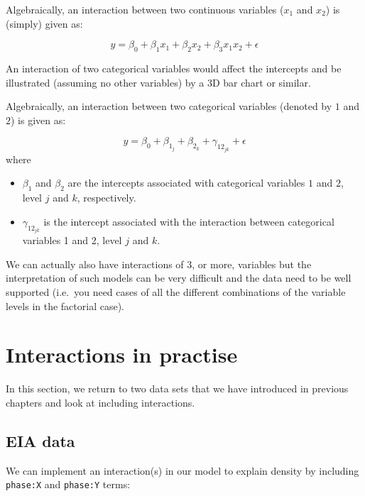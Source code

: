 \documentclass[
  oneside]{krantz}
\begin{document}
Algebraically, an interaction between two continuous variables (\(x_1\) and \(x_2\)) is (simply) given as:

\[y = \beta_0 + \beta_1 x_1 + \beta_2 x_2 + \beta_3 x_1x_2 + \epsilon\]

An interaction of two categorical variables would affect the intercepts and be illustrated (assuming no other variables) by a 3D bar chart or similar.

Algebraically, an interaction between two categorical variables (denoted by \(1\) and \(2\)) is given as:

\[y = \beta_0 + \beta_{1_j} + \beta_{2_k} + \gamma_{12_{jk}} + \epsilon\]
where

\begin{itemize}
\item
  \(\beta_1\) and \(\beta_2\) are the intercepts associated with categorical variables \(1\) and \(2\), level \(j\) and \(k\), respectively.
\item
  \(\gamma_{12_{jk}}\) is the intercept associated with the interaction between categorical variables 1 and 2, level \(j\) and \(k\).
\end{itemize}

We can actually also have interactions of 3, or more, variables but the interpretation of such models can be very difficult and the data need to be well supported (i.e.~you need cases of all the different combinations of the variable levels in the factorial case).

\hypertarget{interactions-in-practise}{%
\section{Interactions in practise}\label{interactions-in-practise}}

In this section, we return to two data sets that we have introduced in previous chapters and look at including interactions.

\hypertarget{eia-data}{%
\subsection{EIA data}\label{eia-data}}

We can implement an interaction(s) in our model to explain density by including \texttt{phase:X} and \texttt{phase:Y} terms:

\scriptsize
\end{document}

